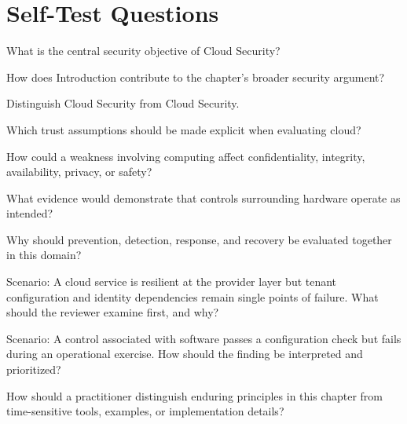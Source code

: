 \documentclass[11pt,letterpaper]{article}
\begin{document}
\section*{Self-Test Questions}
\begin{CornellRecallList}
\item What is the central security objective of Cloud Security?
\item How does Introduction contribute to the chapter's broader security argument?
\item Distinguish Cloud Security from Cloud Security.
\item Which trust assumptions should be made explicit when evaluating cloud?
\item How could a weakness involving computing affect confidentiality, integrity, availability, privacy, or safety?
\item What evidence would demonstrate that controls surrounding hardware operate as intended?
\item Why should prevention, detection, response, and recovery be evaluated together in this domain?
\item Scenario: A cloud service is resilient at the provider layer but tenant configuration and identity dependencies remain single points of failure. What should the reviewer examine first, and why?
\item Scenario: A control associated with software passes a configuration check but fails during an operational exercise. How should the finding be interpreted and prioritized?
\item How should a practitioner distinguish enduring principles in this chapter from time-sensitive tools, examples, or implementation details?
\end{CornellRecallList}
\end{document}
